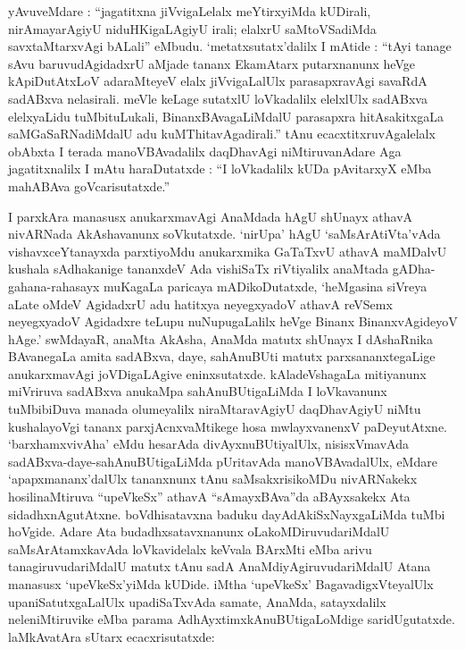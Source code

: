 yAvuveMdare : ``jagatitxna jiVvigaLelalx meYtirxyiMda kUDirali, nirAmayarAgiyU niduHKigaLAgiyU irali; elalxrU saMtoVSadiMda savxtaMtarxvAgi bALali'' eMbudu. `metatxsutatx'dalilx I mAtide : ``tAyi tanage sAvu baruvudAgidadxrU aMjade tananx EkamAtarx putarxnanunx heVge kApiDutAtxLoV adaraMteyeV elalx jiVvigaLalUlx parasapxravAgi savaRdA sadABxva nelasirali. meVle keLage sutatxlU loVkadalilx elelxlUlx sadABxva elelxyaLidu tuMbituLukali, BinanxBAvagaLiMdalU parasapxra hitAsakitxgaLa saMGaSaRNadiMdalU adu kuMThitavAgadirali.'' tAnu ecacxtitxruvAgalelalx obAbxta I terada manoVBAvadalilx daqDhavAgi niMtiruvanAdare Aga jagatitxnalilx I mAtu haraDutatxde : ``I loVkadalilx kUDa pAvitarxyX eMba mahABAva goVcarisutatxde.''

I parxkAra manasusx anukarxmavAgi AnaMdada hAgU shUnayx athavA nivARNada AkAshavanunx soVkutatxde. `nirUpa' hAgU `saMsArAtiVta'vAda vishavxceYtanayxda parxti\-yoMdu anukarxmika GaTaTxvU athavA maMDalvU kushala sAdhakanige tananxdeV Ada vishiSaTx riVtiyalilx anaMtada gADha-gahana-rahasayx muKagaLa paricaya mADikoDu\-tatxde, `heMgasina siVreya aLate oMdeV AgidadxrU adu hatitxya neyegxyadoV athavA reVSemx neyegxyadoV Agidadxre teLupu nuNupugaLalilx heVge Binanx BinanxvAgideyoV hAge.' swMdayaR, anaMta AkAsha, AnaMda matutx shUnayx I dAshaRnika BAvanegaLa amita sadABxva, daye, sahAnuBUti matutx parxsananxtegaLige anukarxmavAgi joVDigaLAgive eninx\-sutatxde. kAladeVshagaLa mitiyanunx miVriruva sadABxva anukaMpa sahAnuBUti\-gaLiMda I loVkavanunx tuMbibiDuva manada olumeyalilx niraMtaravAgiyU daqDhavAgiyU niMtu kushalayoVgi tananx parxjAcnxvaMtikege hosa mwlayxvanenxV paDeyutAtxne. `barxhamx\-vivAha' eMdu hesarAda divAyxnuBUtiyalUlx, nisisxVmavAda sadABxva-daye-sahAnuBUti\-gaLiMda pUritavAda manoVBAvadalUlx, eMdare `apapxmananx'dalUlx tananxnunx tAnu saMsakx\-risikoMDu nivARNakekx hosilinaMtiruva ``upeVkeSx'' athavA ``sAmayxBAva''da aBAyxsakekx Ata sidadhxnAgutAtxne. boVdhisatavxna baduku dayAdAkiSxNayxgaLiMda tuMbi hoVgide. Adare Ata budadhxsatavxnanunx oLakoMDiruvudariMdalU saMsArAtamxkavAda loVkavidelalx \hbox{keVvala} BArxMti eMba arivu tanagiruvudariMdalU matutx tAnu sadA AnaMdiyAgiruvuda\-riMdalU Atana manasusx `upeVkeSx'yiMda kUDide. iMtha `upeVkeSx' BagavadigxVteyalUlx upaniSatutxgaLalUlx upadiSaTxvAda samate, AnaMda, satayxdalilx neleniMtiruvike eMba parama AdhAyxtimxkAnuBUtigaLoMdige saridUgutatxde. laMkAvatAra sUtarx ecacxrisu\-tatxde:
